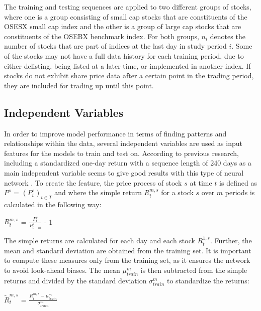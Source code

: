 \indent\newline
The training and testing sequences are applied to two different groups of stocks, where one is a group consisting of small cap stocks that are constituents of the OSESX small cap index and the other is a group of large cap stocks that are constituents of the OSEBX benchmark index. For both groups, $n_{i}$ denotes the number of stocks that are part of indices at the last day in study period $\textit{i}$. Some of the stocks may not have a full data history for each training period, due to either delisting, being listed at a later time, or implemented in another index. If stocks do not exhibit share price data after a certain point in the trading period, they are included for trading up until this point.     

\subsection{Independent Variables}
In order to improve model performance in terms of finding patterns and relationships within the data, several independent variables are used as input features for the models to train and test on. According to previous research, including a standardized one-day return with a sequence length of 240 days as a main independent variable seems to give good results with this type of neural network \cite{krauss}. To create the feature, the price process of stock $\textit{s}$ at time $\textit{t}$ is defined as $P^{s}$ = $(P^{s}_{t})_{t\in T}$ and where the simple return $R^{m,s}_{t}$ for a stock $\textit{s}$ over $\textit{m}$ periods is calculated in the following way:

\indent\newline
$R^{m,s}_{t}$ = $\frac{P^{s}_{t}}{P^{s}_{t-m}}$ - 1

\indent\newline
The simple returns are calculated for each day and each stock $R^{1,s}_{t}$. Further, the mean and standard deviation are obtained from the training set. It is important to compute these measures only from the training set, as it ensures the network to avoid look-ahead biases. The mean $\mu^m_{train}$ is then subtracted from the simple returns and divided by the standard deviation $\sigma^{m}_{train}$ to standardize the returns:

\indent\newline
$\tilde{R}^{m,s}_{t}$ = $\frac{R^{m,s}_{t} - \mu^m_{train}}{\sigma^{m}_{train}}$

